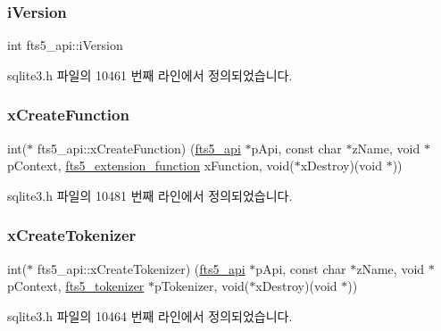 \subsubsection{\texorpdfstring{i\+Version}{iVersion}}
{\footnotesize\ttfamily int fts5\+\_\+api\+::i\+Version}



sqlite3.\+h 파일의 10461 번째 라인에서 정의되었습니다.

\mbox{\label{structfts5__api_acf1a0612be3b91b908f38ecbc6735d17}} 
\subsubsection{\texorpdfstring{x\+Create\+Function}{xCreateFunction}}
{\footnotesize\ttfamily int($\ast$ fts5\+\_\+api\+::x\+Create\+Function) (\hyperlink{structfts5__api}{fts5\+\_\+api} $\ast$p\+Api, const char $\ast$z\+Name, void $\ast$p\+Context, \hyperlink{sqlite3_8h_a8a1df7b5a066b194f490be5936e85c17}{fts5\+\_\+extension\+\_\+function} x\+Function, void($\ast$x\+Destroy)(void $\ast$))}



sqlite3.\+h 파일의 10481 번째 라인에서 정의되었습니다.

\mbox{\label{structfts5__api_a7fe3663f85eab512d5c461e1674da129}} 
\subsubsection{\texorpdfstring{x\+Create\+Tokenizer}{xCreateTokenizer}}
{\footnotesize\ttfamily int($\ast$ fts5\+\_\+api\+::x\+Create\+Tokenizer) (\hyperlink{structfts5__api}{fts5\+\_\+api} $\ast$p\+Api, const char $\ast$z\+Name, void $\ast$p\+Context, \hyperlink{structfts5__tokenizer}{fts5\+\_\+tokenizer} $\ast$p\+Tokenizer, void($\ast$x\+Destroy)(void $\ast$))}



sqlite3.\+h 파일의 10464 번째 라인에서 정의되었습니다.

\mbox{\label{structfts5__api_a20a23794695fa61e2892ad1243b16b67}} 
